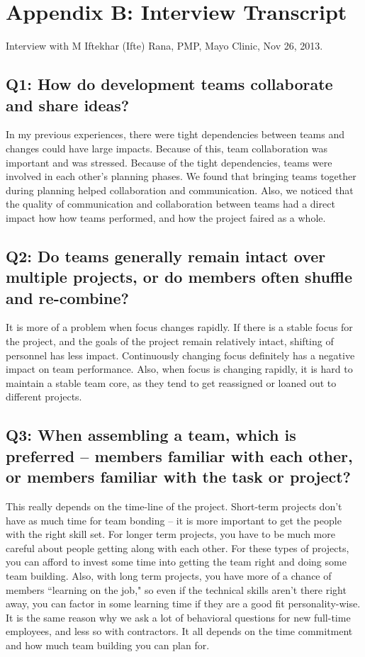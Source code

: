 \clearpage

\section*{Appendix B: Interview Transcript}
Interview with M Iftekhar (Ifte) Rana, PMP\textregistered, Mayo Clinic, Nov 26, 2013.

\subsection*{Q1: How do development teams collaborate and share ideas?}
In my previous experiences, there were tight dependencies between teams and changes could have large impacts. Because of this, team collaboration was important and was stressed. Because of the tight dependencies, teams were involved in each other's planning phases. We found that bringing teams together during planning helped collaboration and communication. Also, we noticed that the quality of communication and collaboration between teams had a direct impact how how teams performed, and how the project faired as a whole.


\subsection*{Q2: Do teams generally remain intact over multiple projects, or do members often shuffle and re-combine?}
It is more of a problem when focus changes rapidly. If there is a stable focus for the project, and the goals of the project remain relatively intact, shifting of personnel has less impact. Continuously changing focus definitely has a negative impact on team performance. Also, when focus is changing rapidly, it is hard to maintain a stable team core, as they tend to get reassigned or loaned out to different projects.


\subsection*{Q3: When assembling a team, which is preferred -- members familiar with each other, or members familiar with the task or project?}
This really depends on the time-line of the project. Short-term projects don't have as much time for team bonding -- it is more important to get the people with the right skill set. For longer term projects, you have to be much more careful about people getting along with each other. For these types of projects, you can afford to invest some time into getting the team right and doing some team building. Also, with long term projects, you have more of a chance of members ``learning on the job," so even if the technical skills aren't there right away, you can factor in some learning time if they are a good fit personality-wise. It is the same reason why we ask a lot of behavioral questions for new full-time employees, and less so with contractors. It all depends on the time commitment and how much team building you can plan for.



